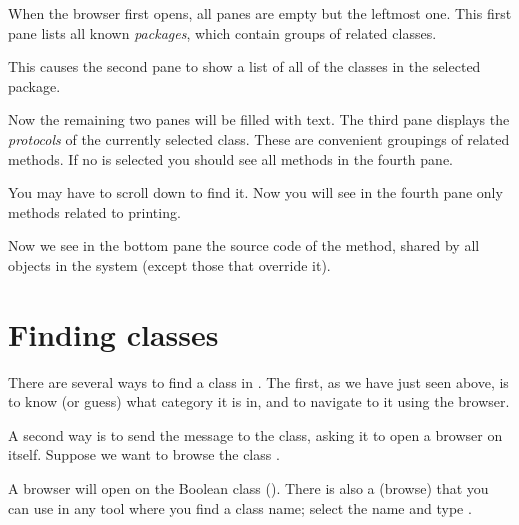 \documentclass[a4paper,10pt,twoside]{book}
\begin{document}
When the browser first opens, all panes are empty but the leftmost one.
This first pane lists all known \emph{packages}, which contain groups of related classes.

This causes the second pane to show a list of all of the classes in the selected package.

Now the remaining two panes will be filled with text.
The third pane displays the \emph{protocols} of the currently selected class.
These are convenient groupings of related methods.
If no  is selected you should see all methods in the fourth pane.

You may have to scroll down to find it.
Now you will see in the fourth pane only methods related to printing.

Now we see in the bottom pane the source code of the  method, shared by all objects in the system (except those that override it).

\section{Finding classes}

There are several ways to find a class in \pharo.  The first, as we have just seen above, is to know (or guess) what category it is in, and to navigate to it using the browser.

A second way is to send the  message to the class, asking it to open a browser on itself.  Suppose we want to browse the class .

A browser will open on the Boolean class ().
There is also a   (browse) that you can use in any tool where you find a class name;
select the name and type .

\end{document}
